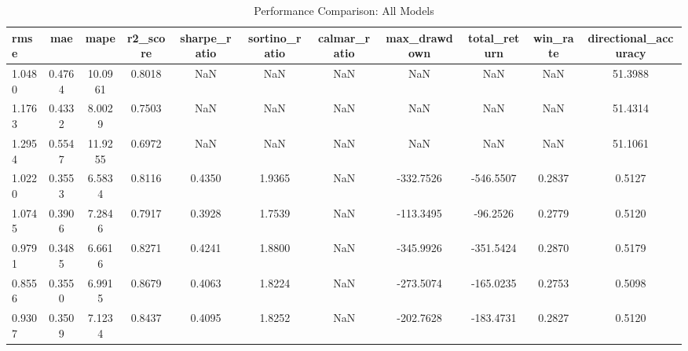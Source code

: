 \begin{table}[htbp]
\caption{Performance Comparison: All Models}
\label{tab:overall_comparison}
\begin{tabular}{lcccccccccc}
\toprule
rmse & mae & mape & r2_score & sharpe_ratio & sortino_ratio & calmar_ratio & max_drawdown & total_return & win_rate & directional_accuracy \\
\midrule
1.0480 & 0.4764 & 10.0961 & 0.8018 & NaN & NaN & NaN & NaN & NaN & NaN & 51.3988 \\
1.1763 & 0.4332 & 8.0029 & 0.7503 & NaN & NaN & NaN & NaN & NaN & NaN & 51.4314 \\
1.2954 & 0.5547 & 11.9255 & 0.6972 & NaN & NaN & NaN & NaN & NaN & NaN & 51.1061 \\
1.0220 & 0.3553 & 6.5834 & 0.8116 & 0.4350 & 1.9365 & NaN & -332.7526 & -546.5507 & 0.2837 & 0.5127 \\
1.0745 & 0.3906 & 7.2846 & 0.7917 & 0.3928 & 1.7539 & NaN & -113.3495 & -96.2526 & 0.2779 & 0.5120 \\
0.9791 & 0.3485 & 6.6616 & 0.8271 & 0.4241 & 1.8800 & NaN & -345.9926 & -351.5424 & 0.2870 & 0.5179 \\
0.8556 & 0.3550 & 6.9915 & 0.8679 & 0.4063 & 1.8224 & NaN & -273.5074 & -165.0235 & 0.2753 & 0.5098 \\
0.9307 & 0.3509 & 7.1234 & 0.8437 & 0.4095 & 1.8252 & NaN & -202.7628 & -183.4731 & 0.2827 & 0.5120 \\
\bottomrule
\end{tabular}
\end{table}

